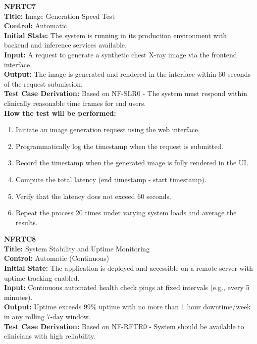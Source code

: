 \documentclass[12pt, titlepage]{article}
\begin{document}
\newcommand{\LATENCYTHRESHOLD}{60 seconds}
\textbf{NFRTC7}\\
\textbf{Title:} Image Generation Speed Test\\
\textbf{Control:} Automatic\\
\textbf{Initial State:} The system is running in its production environment with backend and inference services available.\\
\textbf{Input:} A request to generate a synthetic chest X-ray image via the frontend interface.\\
\textbf{Output:} The image is generated and rendered in the interface within \LATENCYTHRESHOLD{} of the request submission.\\
\textbf{Test Case Derivation:} Based on NF-SLR0 - The system must respond within clinically reasonable time frames for end users.\\

\textbf{How the test will be performed:}
\begin{enumerate}
  \item Initiate an image generation request using the web interface.
  \item Programmatically log the timestamp when the request is submitted.
  \item Record the timestamp when the generated image is fully rendered in the UI.
  \item Compute the total latency (end timestamp - start timestamp).
  \item Verify that the latency does not exceed \LATENCYTHRESHOLD{}.
  \item Repeat the process 20 times under varying system loads and average the results.
\end{enumerate}

\vspace{1em}

\newcommand{\UPTIMETHRESHOLD}{99\% uptime}
\newcommand{\MAXDOWNTIME}{1 hour downtime/week}
\textbf{NFRTC8}\\
\textbf{Title:} System Stability and Uptime Monitoring\\
\textbf{Control:} Automatic (Continuous)\\
\textbf{Initial State:} The application is deployed and accessible on a remote server with uptime tracking enabled.\\
\textbf{Input:} Continuous automated health check pings at fixed intervals (e.g., every 5 minutes).\\
\textbf{Output:} Uptime exceeds \UPTIMETHRESHOLD{} with no more than \MAXDOWNTIME{} in any rolling 7-day window.\\
\textbf{Test Case Derivation:} Based on NF-RFTR0 - System should be available to clinicians with high reliability.\\
\end{document}
